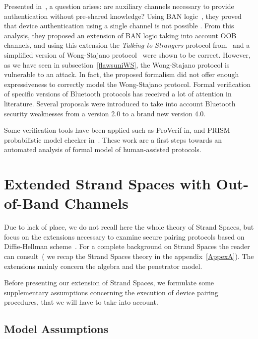 Presented in~\cite{jisis11-1-1-07}, a question arises: are auxiliary channels necessary to provide authentication without pre-shared knowledge? Using BAN logic~\cite{Burrows90alogic}, they proved that device authentication using a single channel is not possible . From this analysis, they proposed an extension of BAN logic taking into account OOB channels, and using this extension the \textit{Talking to Strangers} protocol from~\cite{Smetters02talkingto} and a simplified version of Wong-Stajano protocol~\cite{10.1109/MPRV.2007.76} were shown to be correct. However, as we have seen in subsection~\ref{flawsuniWS}, the Wong-Stajano protocol is vulnerable to an attack. In fact, the proposed formalism did not offer enough expressiveness to correctly model the Wong-Stajano protocol. Formal verification of specific versions of Bluetooth protocols has received a lot of attention in literature. Several proposals were introduced to take into account Bluetooth security weaknesses from a version 2.0 to a brand new version 4.0. 

Some verification tools have been applied such as ProVerif in\cite{Chang_formalanalysis}, and PRISM probabilistic model checker in~\cite{Duflot:2006rm}. These work are a first steps towards an automated analysis of formal model of human-assisted protocols. 

\section{Extended Strand Spaces with Out-of-Band Channels}\label{extended-strand}

Due to lack of place, we do not recall here the whole theory of Strand Spaces, but focus on the extensions necessary to examine secure pairing protocols based on Diffie-Hellman scheme~\cite{Dolev:2006:SPK:2263363.2270116}. For a complete background on Strand Spaces the reader can consult~\cite{674832,Guttman:2002:ATS:568264.568267,1212716}( we recap the Strand Spaces theory in the appendix~\ref{AppexA}). The extensions mainly concern the algebra and the penetrator model.

Before presenting our extension of Strand Spaces, we formulate some supplementary assumptions concerning the execution of device pairing procedures, that we will have to take into account.
 
\subsection{Model Assumptions}

